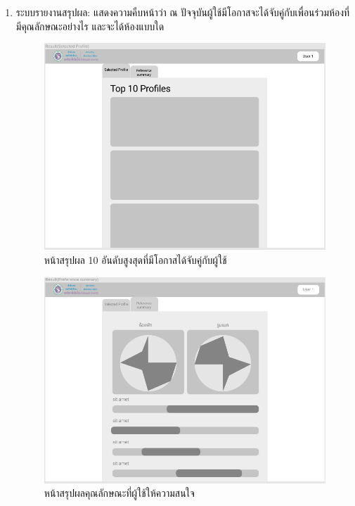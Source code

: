 \begin{enumerate}
  \clearpage
  \item ระบบรายงานสรุปผล: แสดงความคืบหน้าว่า ณ ปัจจุบันผู้ใช้มีโอกาสจะได้จับคู่กับเพื่อนร่วมห้องที่มีคุณลักษณะอย่างไร 
        และจะได้ห้องแบบใด 
  \begin{figure}[h]
  \begin{center}
  \includegraphics[width=\linewidth]{photo/resultSelectedProfile.png}
  \end{center}
  \caption{หน้าสรุปผล 10 อันดับสูงสุดที่มีโอกาสได้จับคู่กับผู้ใช้}
  \label{fig:select-profile}
  \end{figure}
  \begin{figure}[h]
  \begin{center}
  \includegraphics[width=\linewidth]{photo/resultPreferenceSummary.png}
  \end{center}
  \caption{หน้าสรุปผลคุณลักษณะที่ผู้ใช้ให้ความสนใจ}
  \label{fig:summary}
  \end{figure}


\end{enumerate}
